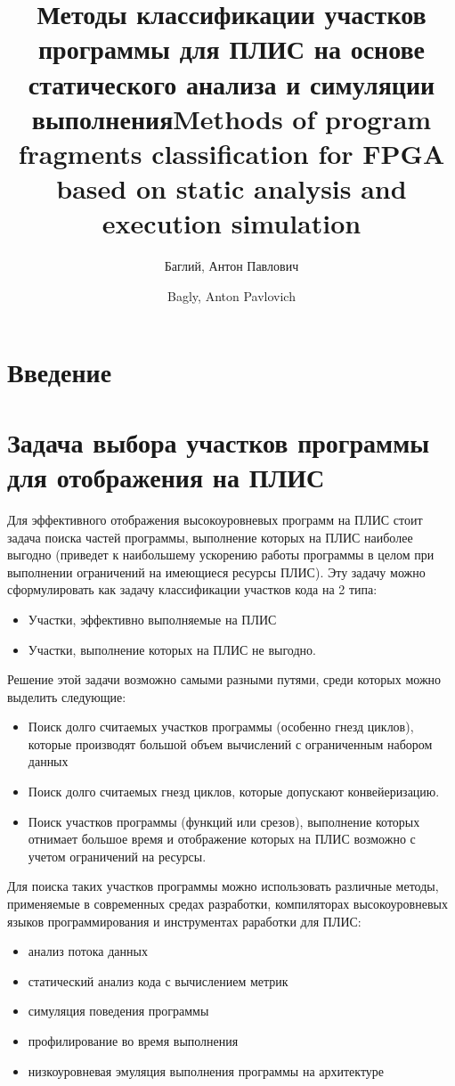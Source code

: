 \documentclass[utf8]{psta}%
\title[Классификация программ для ПЛИС]{Методы классификации участков программы для ПЛИС на основе статического анализа и симуляции выполнения}
\author{Баглий, Антон Павлович}
\title[Program classification for FPGA]{Methods of program fragments classification for FPGA based on static analysis and execution simulation}
\author{Bagly, Anton Pavlovich}
\begin{document}
           
\maketitle   
\section*{Введение}

\section{Задача выбора участков программы для отображения на ПЛИС} 

Для эффективного отображения высокоуровневых программ на ПЛИС стоит задача поиска частей программы, выполнение которых на ПЛИС наиболее выгодно (приведет к наибольшему ускорению работы программы в целом при выполнении ограничений на имеющиеся ресурсы ПЛИС).
Эту задачу можно сформулировать как задачу классификации участков кода на 2 типа:

\begin{itemize}
    \item Участки, эффективно выполняемые на ПЛИС
    \item Участки, выполнение которых на ПЛИС не выгодно.
\end{itemize}

Решение этой задачи возможно самыми разными путями, среди которых можно выделить следующие:

\begin{itemize}
    \item Поиск долго считаемых участков программы (особенно гнезд циклов), которые производят большой объем вычислений с ограниченным набором данных
    \item Поиск долго считаемых гнезд циклов, которые допускают конвейеризацию.
    \item Поиск участков программы (функций или срезов), выполнение которых отнимает большое время и отображение которых на ПЛИС возможно с учетом ограничений на ресурсы.
\end{itemize}

Для поиска таких участков программы можно использовать различные методы, применяемые в современных средах разработки, компиляторах высокоуровневых языков программирования и инструментах раработки для ПЛИС:

\begin{itemize}
    \item анализ потока данных
    \item статический анализ кода с вычислением метрик
    \item симуляция поведения программы
    \item профилирование во время выполнения
    \item низкоуровневая эмуляция выполнения программы на архитектуре
\end{itemize}
\end{document}
